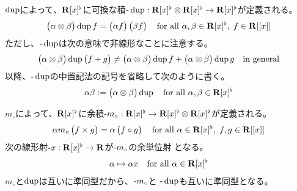 {	$\mathinner{\operatorname{dup}}$によって、$\mathbf{R}[x]^\flat$に可換な積$\myhere\op{dup}:
	\jitu[x]^\flat\otimes\jitu[x]^\flat\to\jitu[x]^\flat$が定義される。
	\begin{equation*}\begin{split}
		\mathinner{\bigl({\alpha\otimes\beta}\bigr)}\mathinner{\operatorname{dup}}f = \mathinner{\bigl({\alpha f}\bigr)}\mathinner{\bigl({\beta f}\bigr)}
		\quad\text{for all } \alpha,\beta\in\mathbf{R}[x]^\flat,\; f\in\mathbf{R}[[x]]
	\end{split}\end{equation*}
	ただし、$\myhere\op{dup}$は次の意味で非線形なことに注意する。
	\begin{equation*}\begin{split}
		\mathinner{\bigl({\alpha\otimes\beta}\bigr)}\mathinner{\operatorname{dup}}\mathinner{\bigl({f+g}\bigr)}
		\neq \mathinner{\bigl({\alpha\otimes\beta}\bigr)}\mathinner{\operatorname{dup}}f
		+ \mathinner{\bigl({\alpha\otimes\beta}\bigr)}\mathinner{\operatorname{dup}}g \quad\text{in general}
	\end{split}\end{equation*}
	以降、$\myhere\op{dup}$の中置記法の記号を省略して次のように書く。
	\begin{equation*}\begin{split}
		\alpha\beta := \mathinner{\bigl({\alpha\otimes\beta}\bigr)}\mathinner{\operatorname{dup}}
		\quad\text{for all } \alpha,\beta\in\mathbf{R}[x]^\flat
	\end{split}\end{equation*}

	$m_\circ$によって、$\mathbf{R}[x]^\flat$に余積$\myhere m_\circ:
	\jitu[x]^\flat\to\jitu[x]^\flat\otimes\jitu[x]^\flat$が定義される。
	\begin{equation*}\begin{split}
		\alpha m_\circ\mathinner{\bigl({f\times g}\bigr)} = \alpha\mathinner{\bigl({f\circ g}\bigr)}
		\quad\text{for all } \alpha\in\mathbf{R}[x]^\flat,\; f,g\in\mathbf{R}[[x]]
	\end{split}\end{equation*}
	次の線形射$\myhere x:\jitu[x]^\flat\to\jitu$が$\myhere m_\circ$の余単位射
	となる。
	\begin{equation*}\begin{split}
		\alpha\mapsto \alpha x \quad\text{for all } \alpha\in\mathbf{R}[x]^\flat
	\end{split}\end{equation*}
	$m_\circ$と$\mathinner{\operatorname{dup}}$は互いに準同型だから、$\myhere m_\circ$と
	$\myhere\op{dup}$も互いに準同型となる。

}
